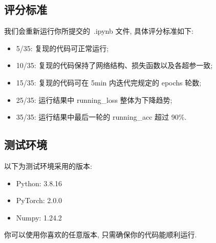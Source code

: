 \documentclass[a4paper,UTF8]{article}
\numberwithin{equation}{section}
\numberwithin{equation}{section}
\theoremstyle{definition}
\begin{document}
\subsection{评分标准}

我们会重新运行你所提交的~.ipynb 文件, 具体评分标准如下:
\begin{itemize}
    \item 5/35: 复现的代码可正常运行;
    \item 10/35: 复现的代码保持了网络结构、损失函数以及各超参一致;
    \item 15/35: 复现的代码可在 5min 内迭代完规定的 epochs 轮数;
    \item 25/35: 运行结果中 running\_loss 整体为下降趋势;
    \item 35/35: 运行结果中最后一轮的 running\_acc 超过 90\%.
\end{itemize}

\subsection{测试环境}

以下为测试环境采用的版本:
\begin{itemize}
    \item Python: 3.8.16
    \item PyTorch: 2.0.0
    \item Numpy: 1.24.2
\end{itemize}
你可以使用你喜欢的任意版本, 只需确保你的代码能顺利运行.
\end{document}
